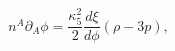 \begin{equation}
n^A\partial_A\phi=\frac{\kappa_5^2}{2}\frac{d\xi}{d\phi}(\rho-3p),
\end{equation}

